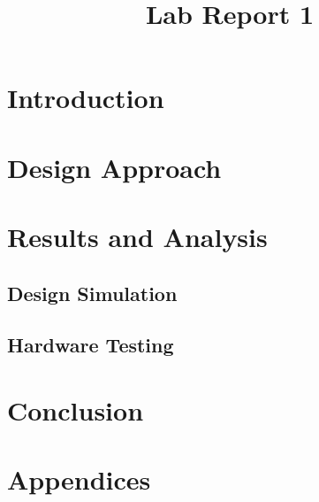 \documentclass[12pt, letterpaper]{article}
\title{Lab Report 1}
\begin{document}
\maketitle

\tableofcontents
\section{Introduction}


\section{Design Approach}


\section{Results and Analysis}

\subsection{Design Simulation}

\subsection{Hardware Testing}


\section{Conclusion}



\newpage
\section*{Appendices}
\end{document}
